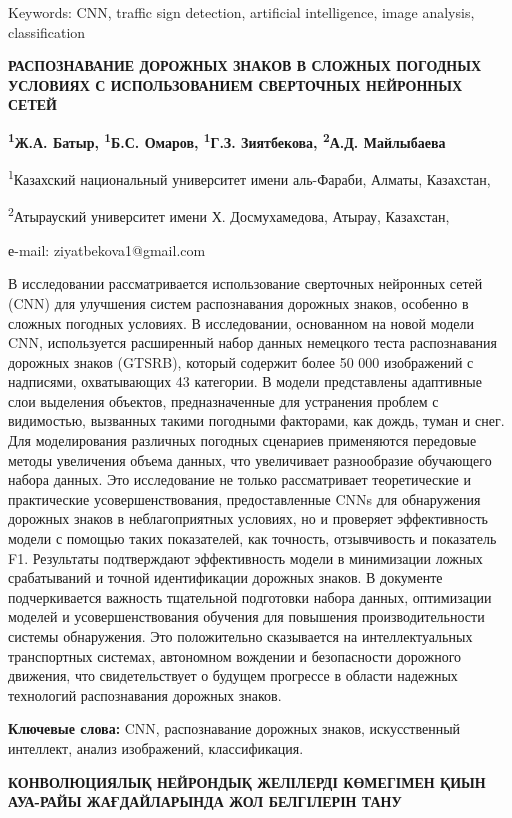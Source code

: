 Keywords: CNN, traffic sign detection, artificial intelligence, image
analysis, classification

\textbf{РАСПОЗНАВАНИЕ ДОРОЖНЫХ ЗНАКОВ В СЛОЖНЫХ ПОГОДНЫХ УСЛОВИЯХ С
ИСПОЛЬЗОВАНИЕМ СВЕРТОЧНЫХ НЕЙРОННЫХ СЕТЕЙ}

\textbf{\textsuperscript{1}Ж.А. Батыр, \textsuperscript{1}Б.С. Омаров,
\textsuperscript{1}Г.З. Зиятбекова, \textsuperscript{2}А.Д. Майлыбаева}

\textsuperscript{1}Казахский национальный университет имени аль-Фараби,
Алматы, Казахстан,

\textsuperscript{2}Атырауский университет имени Х. Досмухамедова,
Атырау, Казахстан,

е-mail: ziyatbekova1@gmail.com

В исследовании рассматривается использование сверточных нейронных сетей
(CNN) для улучшения систем распознавания дорожных знаков, особенно в
сложных погодных условиях. В исследовании, основанном на новой модели
CNN, используется расширенный набор данных немецкого теста распознавания
дорожных знаков (GTSRB), который содержит более 50 000 изображений с
надписями, охватывающих 43 категории. В модели представлены адаптивные
слои выделения объектов, предназначенные для устранения проблем с
видимостью, вызванных такими погодными факторами, как дождь, туман и
снег. Для моделирования различных погодных сценариев применяются
передовые методы увеличения объема данных, что увеличивает разнообразие
обучающего набора данных. Это исследование не только рассматривает
теоретические и практические усовершенствования, предоставленные CNNs
для обнаружения дорожных знаков в неблагоприятных условиях, но и
проверяет эффективность модели с помощью таких показателей, как
точность, отзывчивость и показатель F1. Результаты подтверждают
эффективность модели в минимизации ложных срабатываний и точной
идентификации дорожных знаков. В документе подчеркивается важность
тщательной подготовки набора данных, оптимизации моделей и
усовершенствования обучения для повышения производительности системы
обнаружения. Это положительно сказывается на интеллектуальных
транспортных системах, автономном вождении и безопасности дорожного
движения, что свидетельствует о будущем прогрессе в области надежных
технологий распознавания дорожных знаков.

\textbf{Ключевые слова:} CNN, распознавание дорожных знаков,
искусственный интеллект, анализ изображений, классификация.

\textbf{КОНВОЛЮЦИЯЛЫҚ НЕЙРОНДЫҚ ЖЕЛІЛЕРДІ КӨМЕГІМЕН ҚИЫН АУА-РАЙЫ
ЖАҒДАЙЛАРЫНДА ЖОЛ БЕЛГІЛЕРІН ТАНУ}

